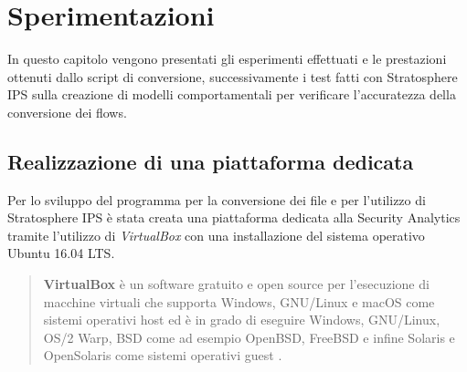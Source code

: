 \documentclass[../main.tex]{subfiles}
\begin{document}
\chapter{Sperimentazioni}

In questo capitolo vengono presentati gli esperimenti effettuati e le prestazioni ottenuti dallo script di conversione, successivamente i test fatti con Stratosphere IPS sulla creazione di modelli comportamentali per verificare l'accuratezza della conversione dei flows.

\section{Realizzazione di una piattaforma dedicata}

Per lo sviluppo del programma per la conversione dei file e per l'utilizzo di Stratosphere IPS è stata creata una piattaforma dedicata alla Security Analytics tramite l'utilizzo di \textit{VirtualBox} con una installazione del sistema operativo Ubuntu 16.04 LTS.


\begin{verse}
				\textbf{VirtualBox} è un software gratuito e open source per l'esecuzione di macchine virtuali che supporta Windows, GNU/Linux e macOS come sistemi operativi host ed è in grado di eseguire Windows, GNU/Linux, OS/2 Warp, BSD come ad esempio OpenBSD, FreeBSD e infine Solaris e OpenSolaris come sistemi operativi guest \cite{virtualbox}. 
\end{verse}
\end{document}
